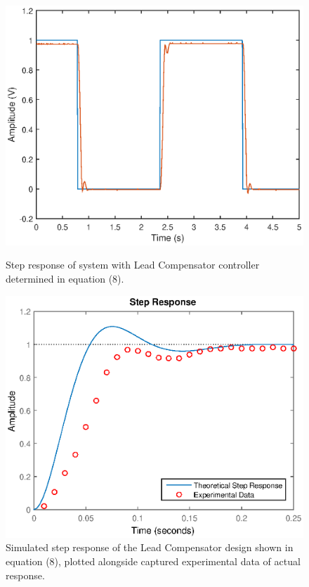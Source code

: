 \documentclass{article}
\begin{document}
\begin{figure}[H]
	\hspace{0.5cm}
	\begin{minipage}{7cm}
		\centering
		\includegraphics[scale=0.5]{fig13}
		\caption{Step response of system with Lead Compensator controller determined in equation (8).}
	\end{minipage}
	\hspace{1cm}
	\begin{minipage}{7cm}
		\centering
		\includegraphics[scale=0.5]{fig14}
		\caption{Simulated step response of the Lead Compensator design shown in equation (8), plotted alongside captured experimental data of actual response.}
	\end{minipage}
\end{figure}
\end{document}

